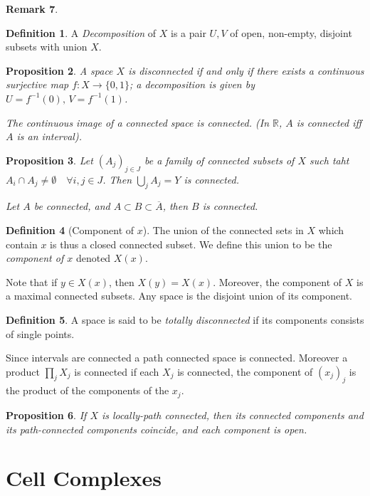 \documentclass[11pt,a4paper]{article}
\theoremstyle{definition}
\newtheorem{definition}{Definition}[section]
\newtheorem{remark}[definition]{Remark}
\theoremstyle{plain}
\newtheorem{proposition}[definition]{Proposition}
\theoremstyle{remark}
\begin{document}
\begin{remark}
\begin{definition}
  A \emph{Decomposition} of $X$ is a pair $U,V$ of open, non-empty, disjoint subsets with union $X$. 
\end{definition}

\begin{proposition}
  A space $X$ is disconnected if and only if there exists a continuous surjective map $f \colon X \to \{0,1\}$; a decomposition 
  is given by $U = f^{-1}(0), \, V = f^{-1}(1)$. 

  The continuous image of a connected space is connected. (In $\mathbb{R}$, 
  $A$ is connected iff $A$ is an interval). 
\end{proposition}

\begin{proposition}
  Let $(A_j)_{j \in J}$ be a family of connected subsets of $X$ such taht $A_i \cap A_j \neq \emptyset \quad \forall i, j \in J$. 
  Then $\bigcup_{j} A_j = Y$ is connected.

  Let $A$ be connected, and $A \subset B \subset \overline{A}$, then $B$ is connected. 
\end{proposition}

\begin{definition}[Component of $x$]
  The union of the connected sets in $X$ which contain $x$ is thus a closed connected subset. 
  We define this union to be the \emph{component of $x$} denoted $X(x)$. 

  Note that if $y \in X(x)$, then $X(y) = X(x)$. Moreover, the component of $X$ is a maximal connected subsets. Any space is 
  the disjoint union of its component. 
\end{definition}

\begin{definition}
  A space is said to be \emph{totally disconnected} if its components consists of single points.
\end{definition}

Since intervals are connected a path connected space is connected. Moreover a product $\prod_j X_j$ 
is connected if each $X_j$ is connected, the component of $(x_j)_j$ is the product of the 
components of the $x_j$. 

\begin{proposition}
  If $X$ is locally-path connected, then its connected components and its path-connected components coincide, 
  and each component is open. 
\end{proposition}

\section{Cell Complexes} 


\end{remark}
\end{document}
